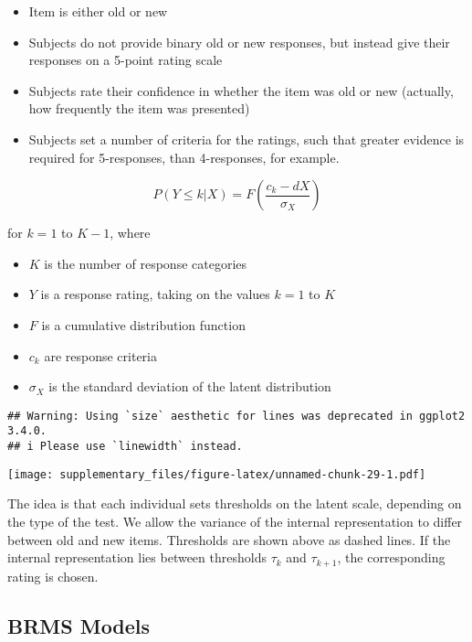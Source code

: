\documentclass[
  man,floatsintext]{apa7}
\providecommand{\tightlist}{%
  \setlength{\itemsep}{0pt}\setlength{\parskip}{0pt}}
\begin{document}
\begin{itemize}
\tightlist
\item
  Item is either old or new
\item
  Subjects do not provide binary old or new responses, but instead give their responses on a 5-point rating scale
\item
  Subjects rate their confidence in whether the item was old or new (actually, how frequently the item was presented)
\item
  Subjects set a number of criteria for the ratings, such that greater evidence is required for 5-responses, than 4-responses, for example.
\end{itemize}

\[ P(Y \leq k | X) = F\left(  \frac{ c_k - dX} { \sigma_X }  \right)\]

for \(k=1\) to \(K-1\), where

\begin{itemize}
\tightlist
\item
  \(K\) is the number of response categories
\item
  \(Y\) is a response rating, taking on the values \(k=1\) to \(K\)
\item
  \(F\) is a cumulative distribution function
\item
  \(c_k\) are response criteria
\item
  \(\sigma_X\) is the standard deviation of the latent distribution
\end{itemize}

\begin{verbatim}
## Warning: Using `size` aesthetic for lines was deprecated in ggplot2 3.4.0.
## i Please use `linewidth` instead.
\end{verbatim}

\texttt{[image: supplementary\_files/figure-latex/unnamed-chunk-29-1.pdf]}

The idea is that each individual sets thresholds on the latent scale, depending on the type of the test. We allow the variance of the internal representation to differ between old and new items. Thresholds are shown above as dashed lines. If the internal representation lies between thresholds \(\tau_k\) and \(\tau_{k+1}\), the corresponding rating is chosen.

\hypertarget{brms-models}{%
\subsection{BRMS Models}\label{brms-models}}
\end{document}
